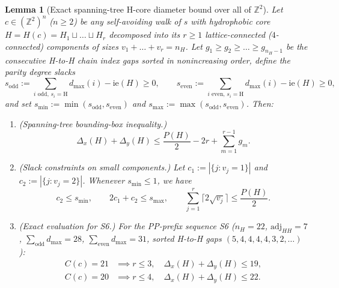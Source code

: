 \documentclass[11pt]{article}
\newtheorem{lemma}{Lemma}
\newcommand{\Z}{\mathbb{Z}}
\begin{document}
\begin{lemma}[Exact spanning-tree H-core diameter bound over all of $\Z^2$]\label{lem:spantree}
Let $c \in (\Z^2)^n$ ($n \ge 2$) be any self-avoiding walk of $s$ with hydrophobic core $H = H(c) = H_1 \sqcup \dots \sqcup H_r$ decomposed into its $r \ge 1$ lattice-connected ($4$-connected) components of sizes $v_1 + \dots + v_r = n_H$. Let $g_1 \ge g_2 \ge \dots \ge g_{n_H - 1}$ be the consecutive H-to-H chain index gaps sorted in nonincreasing order, define the parity degree slacks
\[
  s_{\mathrm{odd}} := \sum_{i \text{ odd},\, s_i=\mathrm{H}} d_{\max}(i) - \mathrm{ie}(H) \ge 0,
  \qquad
  s_{\mathrm{even}} := \sum_{i \text{ even},\, s_i=\mathrm{H}} d_{\max}(i) - \mathrm{ie}(H) \ge 0,
\]
and set $s_{\min} := \min(s_{\mathrm{odd}}, s_{\mathrm{even}})$ and $s_{\max} := \max(s_{\mathrm{odd}}, s_{\mathrm{even}})$. Then:
\begin{enumerate}[leftmargin=*,topsep=2pt,itemsep=1pt]
\item \emph{(Spanning-tree bounding-box inequality.)}
\begin{equation}\label{eq:spantree}
  \Delta_x(H) + \Delta_y(H) \le \frac{P(H)}{2} - 2r + \sum_{m=1}^{r-1} g_m.
\end{equation}
\item \emph{(Slack constraints on small components.)} Let $c_1 := |\{j : v_j = 1\}|$ and $c_2 := |\{j : v_j = 2\}|$. Whenever $s_{\min} \le 1$, we have
\begin{equation}\label{eq:smallcomp}
  c_2 \le s_{\min},
  \qquad
  2 c_1 + c_2 \le s_{\max},
  \qquad
  \sum_{j=1}^r \bigl\lceil 2\sqrt{v_j} \bigr\rceil \le \frac{P(H)}{2}.
\end{equation}
\item \emph{(Exact evaluation for S6.)} For the PP-prefix sequence S6 ($n_H = 22$, $\mathrm{adj}_{HH} = 7$, $\sum_{\mathrm{odd}} d_{\max} = 28$, $\sum_{\mathrm{even}} d_{\max} = 31$, sorted H-to-H gaps $(5, 4, 4, 4, 4, 3, 2, \dots)$):
\begin{align*}
  C(c) = 21 &\implies r \le 3,\quad \Delta_x(H) + \Delta_y(H) \le 19, \\
  C(c) = 20 &\implies r \le 4,\quad \Delta_x(H) + \Delta_y(H) \le 22.
\end{align*}
\end{enumerate}
\end{lemma}
\end{document}

